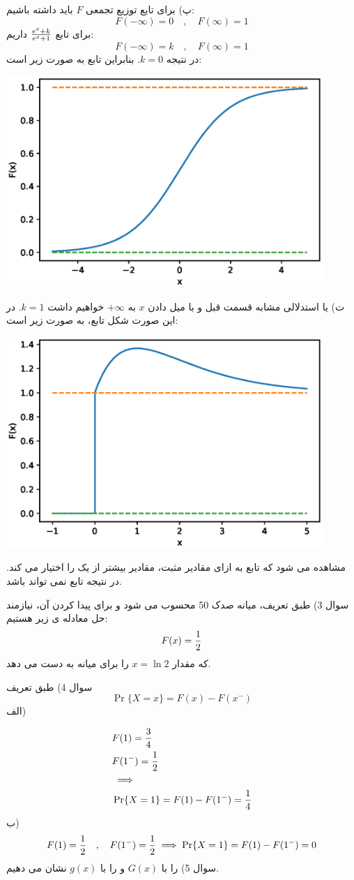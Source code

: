 \documentclass[10pt,letterpaper]{report}
\newcommand{\eqn}[1]{
\[\begin{split}
#1
\end{split}\]
}
\begin{document}
پ) برای تایع توزیع تجمعی $F$ باید داشته باشیم:
$$
F(-\infty)=0\quad,\quad F(\infty)=1
$$
برای تابع 
$
{e^x+k\over e^x+1}
$
داریم:
$$
F(-\infty)=k\quad,\quad F(\infty)=1
$$
در نتیجه $k=0$. بنابراین تابع  به صورت زیر است:
\begin{center}
\includegraphics[width=120mm]{Q2B.eps}
\end{center}
ت) یا استدلالی مشابه قسمت قبل و با میل دادن $x$ به $+\infty$ خواهیم داشت $k=1$. در این صورت شکل تابع، به صورت زیر است:
\begin{center}
\includegraphics[width=120mm]{Q2C.eps}
\end{center}
مشاهده می شود که تابع به ازای مقادیر مثبت، مقادیر بیشتر از یک را اختیار می کند. در نتیجه تابع نمی تواند  باشد.

سوال 3) طبق تعریف، میانه صدک 50 محسوب می شود و برای پیدا کردن آن، نیازمند حل معادله ی زیر هستیم:
$$
F(x)={1\over 2}
$$
 که مقدار $x=\ln2$ را برای میانه به دست می دهد.

سوال 4) طبق تعریف
$$
\Pr\{X=x\}=F(x)-F(x^-)
$$
الف)
\eqn{
&F(1)={3\over 4}
\\&F(1^-)={1\over 2}
\\&\implies
\\&\Pr\{X=1\}=F(1)-F(1^-)={1\over 4}
}{}
ب)
$$F(1)={1\over 2}\quad,\quad F(1^-)={1\over 2}\implies\Pr\{X=1\}=F(1)-F(1^-)=0$$
سوال 5)  را با $G(x)$ و  را با $g(x)$ نشان می دهیم.
\end{document}
